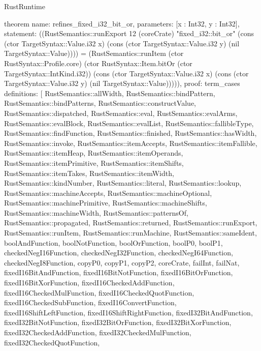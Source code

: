 \begin{lexlean}{RustRuntime}
\begin{semanticmodule}
theorem{
  name: refines_fixed_i32_bit_or,
  parameters: [x : Int32, y : Int32],
  statement: ((RustSemantics::runExport 12 (coreCrate) "fixed_i32::bit_or" (cons (ctor TargetSyntax::Value.i32 x) (cons (ctor TargetSyntax::Value.i32 y) (nil TargetSyntax::Value)))) = (RustSemantics::runItem (ctor RustSyntax::Profile.core) (ctor RustSyntax::Item.bitOr (ctor TargetSyntax::IntKind.i32)) (cons (ctor TargetSyntax::Value.i32 x) (cons (ctor TargetSyntax::Value.i32 y) (nil TargetSyntax::Value))))),
  proof: term_cases{
    definitions: [
      RustSemantics::allWidth,
      RustSemantics::bindPattern,
      RustSemantics::bindPatterns,
      RustSemantics::constructValue,
      RustSemantics::dispatched,
      RustSemantics::eval,
      RustSemantics::evalArms,
      RustSemantics::evalBlock,
      RustSemantics::evalList,
      RustSemantics::fallibleType,
      RustSemantics::findFunction,
      RustSemantics::finished,
      RustSemantics::hasWidth,
      RustSemantics::invoke,
      RustSemantics::itemAccepts,
      RustSemantics::itemFallible,
      RustSemantics::itemHeap,
      RustSemantics::itemOperands,
      RustSemantics::itemPrimitive,
      RustSemantics::itemShifts,
      RustSemantics::itemTakes,
      RustSemantics::itemWidth,
      RustSemantics::kindNumber,
      RustSemantics::literal,
      RustSemantics::lookup,
      RustSemantics::machineAccepts,
      RustSemantics::machineOptional,
      RustSemantics::machinePrimitive,
      RustSemantics::machineShifts,
      RustSemantics::machineWidth,
      RustSemantics::patternsOf,
      RustSemantics::propagated,
      RustSemantics::returned,
      RustSemantics::runExport,
      RustSemantics::runItem,
      RustSemantics::runMachine,
      RustSemantics::sameIdent,
      boolAndFunction,
      boolNotFunction,
      boolOrFunction,
      boolP0,
      boolP1,
      checkedNegI16Function,
      checkedNegI32Function,
      checkedNegI64Function,
      checkedNegI8Function,
      copyP0,
      copyP1,
      copyP2,
      coreCrate,
      failInt,
      failNat,
      fixedI16BitAndFunction,
      fixedI16BitNotFunction,
      fixedI16BitOrFunction,
      fixedI16BitXorFunction,
      fixedI16CheckedAddFunction,
      fixedI16CheckedMulFunction,
      fixedI16CheckedQuotFunction,
      fixedI16CheckedSubFunction,
      fixedI16ConvertFunction,
      fixedI16ShiftLeftFunction,
      fixedI16ShiftRightFunction,
      fixedI32BitAndFunction,
      fixedI32BitNotFunction,
      fixedI32BitOrFunction,
      fixedI32BitXorFunction,
      fixedI32CheckedAddFunction,
      fixedI32CheckedMulFunction,
      fixedI32CheckedQuotFunction,
}}
\end{semanticmodule}
\end{lexlean}
